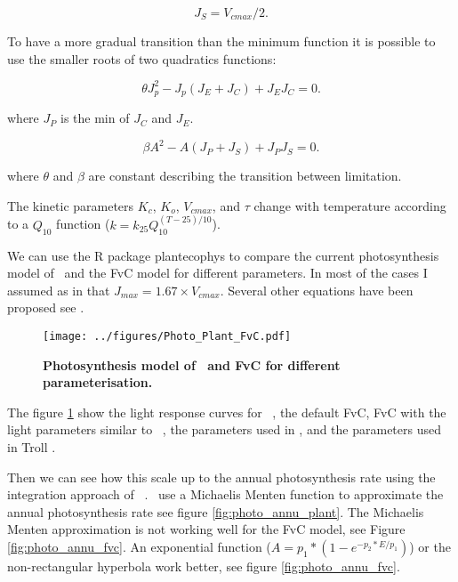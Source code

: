 \documentclass[a4paper,11pt]{article}
\begin{document}
\begin{equation}
\label{eq:JS}
J_S= V_{cmax}/2.
\end{equation}

To have a more gradual transition than the minimum function it is possible to use the smaller roots of two quadratics functions:

\begin{equation}
\label{eq:Q1}
\theta J_p^2 - J_p(J_E+J_C) + J_E J_C= 0.
\end{equation}

where $J_P$ is the min of $J_C$ and $J_E$.

\begin{equation}
\label{eq:Q2}
\beta A^2 - A(J_P+J_S) + J_P J_S= 0.
\end{equation}

where $\theta$ and $\beta$ are constant describing the transition between limitation.

The kinetic parameters $K_c$, $K_o$, $V_{cmax}$, and $\tau$ change with temperature according to a $Q_{10}$ function ($k = k_{25} Q_{10}^{(T-25)/10}$).

\clearpage

We can use the R package plantecophys \citep{Duursma-2015} to compare
the current photosynthesis model of \plant\ and the FvC model for
different parameters. In most of the cases I assumed as in
\citet{Medlyn-2002} that $J_{max} = 1.67 \times V_{cmax}$. Several
other equations have been proposed see
\citet{Walker-2014,Kattge-2011}.


\begin{figure}[ht]
\centering
\texttt{[image: ../figures/Photo\_Plant\_FvC.pdf]}
\caption{\textbf{Photosynthesis model of \plant\ and FvC for different parameterisation.}
\label{fig:photo}}
\end{figure}

The figure \ref{fig:photo} show the light response curves for \plant\
, the default FvC, FvC with the light parameters similar to \plant\ , the parameters used in \citet{Sterck-2011}, and the parameters used in Troll \citep{Marechaux-2017}.

Then we can see how this scale up to the annual photosynthesis rate using the integration approach of \plant\ . \plant\ use a Michaelis Menten function to approximate the annual photosynthesis rate see figure \ref{fig:photo_annu_plant}. The Michaelis Menten approximation is not working well for the FvC model, see Figure \ref{fig:photo_annu_fvc}. An exponential function \citep{Chen-2016} ($A = p_1 *(1-e^{-p_2* E/p_1})$) or the non-rectangular hyperbola work better, see figure \ref{fig:photo_annu_fvc}.
\end{document}
